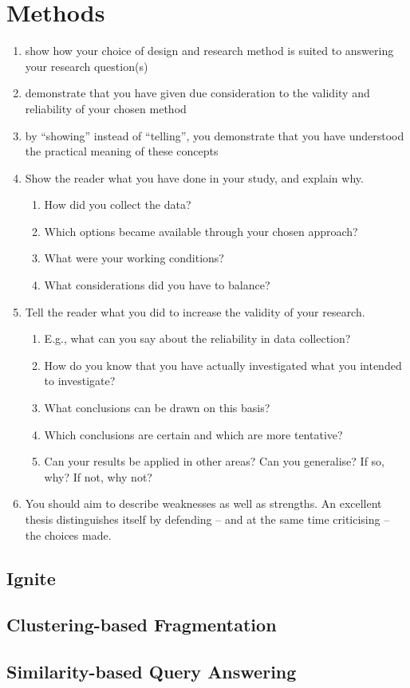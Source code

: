
\section{Methods}
\label{sec:meth}
 
 \begin{enumerate}
     \item show how your choice of design and research method is suited to answering your research question(s)
     \item demonstrate that you have given due consideration to the validity and reliability of your chosen method
     \item by “showing” instead of “telling”, you demonstrate that you have understood the practical meaning of these concepts
     \item Show the reader what you have done in your study, and explain why. 
     \begin{enumerate}
         \item How did you collect the data? 
         \item Which options became available through your chosen approach?
         \item What were your working conditions? 
         \item What considerations did you have to balance?
     \end{enumerate}
    \item Tell the reader what you did to increase the validity of your research. 
    \begin{enumerate}
        \item E.g., what can you say about the reliability in data collection? 
        \item How do you know that you have actually investigated what you intended to investigate? 
        \item What conclusions can be drawn on this basis? 
        \item Which conclusions are certain and which are more tentative?
        \item Can your results be applied in other areas? Can you generalise? If so, why? If not, why not?
    \end{enumerate}
    \item You should aim to describe weaknesses as well as strengths. An excellent thesis distinguishes itself by defending – and at the same time criticising – the choices made.
 \end{enumerate}
 
 
 \subsection{Ignite}
 \label{sec:meth_ign}
 
 \subsection{Clustering-based Fragmentation}
 \label{sec:meth_cbfr}
 
 \subsection{Similarity-based Query Answering}
 \label{sec:meth_sbqa}